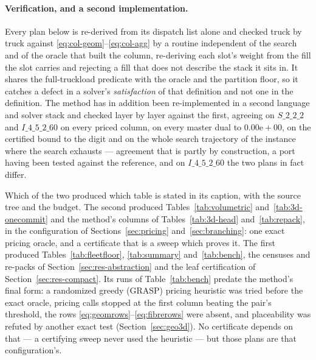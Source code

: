\paragraph{Verification, and a second implementation.}
Every plan below is re-derived from its dispatch list alone and checked
truck by truck against \eqref{eq:col-geom}--\eqref{eq:col-agg} by a
routine independent of the search and of the oracle that built the
column, re-deriving each slot's weight from the fill the slot carries
and rejecting a fill that does not describe the stack it sits in. It
shares the full-truckload predicate with the oracle and the partition
floor, so it catches a defect in a solver's \emph{satisfaction} of that
definition and not one in the definition. The method has in addition
been re-implemented in a second language and solver stack and checked
layer by layer against the first, agreeing on $S\_2\_2\_2$ and
$I\_4\_5\_2\_60$ on every priced column, on every master dual to
$0.00\mathrm{e}{+}00$, on the certified bound to the digit and on the
whole search trajectory of the instance where the search exhausts ---
agreement that is partly by construction, a port having been tested
against the reference, and on $I\_4\_5\_2\_60$ the two plans in fact
differ.

Which of the two produced which table is stated in its caption, with
the source tree and the budget. The second produced
Tables~\ref{tab:volumetric} and~\ref{tab:3d-onecommit} and the method's
columns of Tables~\ref{tab:3d-head} and~\ref{tab:repack}, in the
configuration of Sections~\ref{sec:pricing} and~\ref{sec:branching}:
one exact pricing oracle, and a certificate that is a sweep which
proves it. The first produced Tables~\ref{tab:fleetfloor},
\ref{tab:summary} and~\ref{tab:bench}, the censuses and re-packs of
Section~\ref{sec:res-abstraction} and the leaf certification of
Section~\ref{sec:res-compact}. Its runs of Table~\ref{tab:bench}
predate the method's final form: a randomized greedy (GRASP) pricing
heuristic was tried before the exact oracle, pricing calls stopped at
the first column beating the pair's threshold, the rows
\eqref{eq:geomrows}--\eqref{eq:fibrerows} were absent, and placeability
was refuted by another exact test (Section~\ref{sec:geo3d}). No
certificate depends on that --- a certifying sweep never used the
heuristic --- but those plans are that configuration's.

